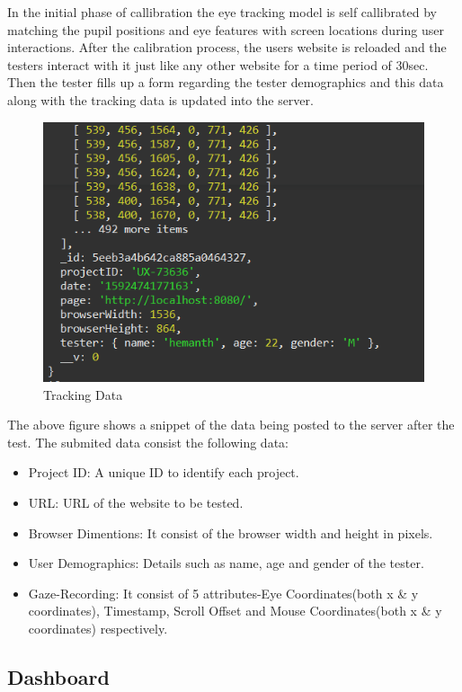 \documentclass[12pt,a4paper,final]{extreport}
\begin{document}
In the initial phase of callibration the eye tracking model is self callibrated by matching the pupil positions and eye features with screen locations during user interactions.
After the calibration process, the users website is reloaded and the testers interact with it just like any other website for a time period of 30sec. Then the tester fills up a form regarding the tester demographics and this data along with the tracking data is updated into the server.
\begin{figure}[H]
    \centering
    \includegraphics[width=\linewidth]{tracking-data.png}
    \caption{Tracking Data}
\end{figure}

The above figure shows a snippet of the data being posted to the server after the test.
The submited data consist the following data:
\begin{itemize}
	\item Project ID: A unique ID to identify each project.
	\item URL: URL of the website to be tested.
	\item Browser Dimentions: It consist of the browser width and height in pixels.
	\item User Demographics: Details such as name, age and gender of the tester.
	\item Gaze-Recording: It consist of 5 attributes-Eye Coordinates(both x \& y coordinates), Timestamp, Scroll Offset and Mouse Coordinates(both x \& y coordinates) respectively.
\end{itemize}

\subsection{Dashboard}
\end{document}
